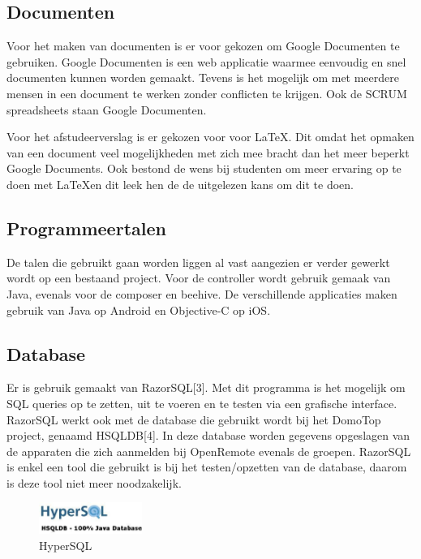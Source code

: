 \documentclass[]{article}
\begin{document}
\subsection{Documenten}

Voor het maken van documenten is er voor gekozen om Google Documenten te
gebruiken. Google Documenten is een web applicatie waarmee eenvoudig en
snel documenten kunnen worden gemaakt. Tevens is het mogelijk om met
meerdere mensen in een document te werken zonder conflicten te krijgen. Ook
de SCRUM spreadsheets staan Google Documenten.

Voor het afstudeerverslag is er gekozen voor voor \LaTeX. Dit omdat het opmaken
van een document veel mogelijkheden met zich mee bracht dan het meer
beperkt Google Documents. Ook bestond de wens bij studenten
om meer ervaring op te doen met \LaTeX\space en dit leek hen de de uitgelezen kans om
dit te doen.

\subsection{Programmeertalen}
De talen die gebruikt gaan worden liggen al vast aangezien er verder 
gewerkt wordt op een bestaand project. Voor de controller wordt gebruik gemaak van
Java, evenals voor de composer en beehive. De verschillende applicaties maken gebruik
van Java op Android en Objective-C op iOS.

\newpage
\subsection{Database}
Er is gebruik gemaakt van RazorSQL[3]. Met dit programma is het mogelijk om
SQL queries op te zetten, uit te voeren en te testen via een grafische
interface. RazorSQL werkt ook met de database die gebruikt wordt bij het DomoTop project,
genaamd HSQLDB[4]. In deze database worden gegevens opgeslagen van de
apparaten die zich aanmelden bij OpenRemote evenals de groepen.
RazorSQL is enkel een tool die gebruikt is bij het
testen/opzetten van de database, daarom is deze tool niet meer
noodzakelijk.


\begin{figure}
  \begin{center}
    \includegraphics[width=0.30\textwidth]{hsql.pdf}
  \end{center}
  \caption{HyperSQL}
\end{figure}
\end{document}
